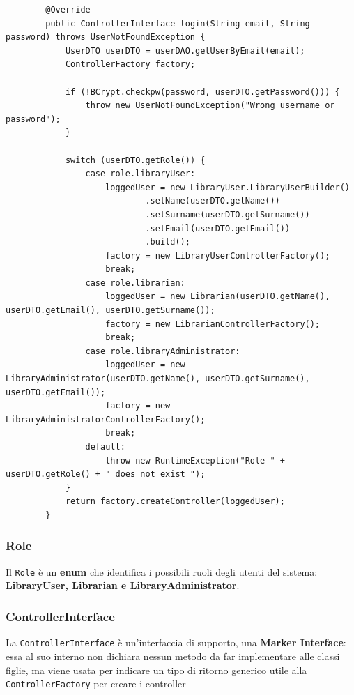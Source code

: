     \begin{listing}[H]
        \begin{verbatim}
        @Override
        public ControllerInterface login(String email, String password) throws UserNotFoundException {
            UserDTO userDTO = userDAO.getUserByEmail(email);
            ControllerFactory factory;
    
            if (!BCrypt.checkpw(password, userDTO.getPassword())) {
                throw new UserNotFoundException("Wrong username or password");
            }
    
            switch (userDTO.getRole()) {
                case role.libraryUser:
                    loggedUser = new LibraryUser.LibraryUserBuilder()
                            .setName(userDTO.getName())
                            .setSurname(userDTO.getSurname())
                            .setEmail(userDTO.getEmail())
                            .build();
                    factory = new LibraryUserControllerFactory();
                    break;
                case role.librarian:
                    loggedUser = new Librarian(userDTO.getName(), userDTO.getEmail(), userDTO.getSurname());
                    factory = new LibrarianControllerFactory();
                    break;
                case role.libraryAdministrator:
                    loggedUser = new LibraryAdministrator(userDTO.getName(), userDTO.getSurname(), userDTO.getEmail());
                    factory = new LibraryAdministratorControllerFactory();
                    break;
                default:
                    throw new RuntimeException("Role " + userDTO.getRole() + " does not exist ");
            }
            return factory.createController(loggedUser);
        }
        \end{verbatim}
        \caption{Metodo \textbf{login}}
        \label{lst:login}
    \end{listing}

    \subsubsection{Role}
    Il \texttt{Role} è un \textbf{enum} che identifica i possibili ruoli degli utenti del sistema: \textbf{LibraryUser, Librarian e LibraryAdministrator}.\\

    \subsubsection{ControllerInterface}
    La \texttt{ControllerInterface} è un'interfaccia di supporto, una \textbf{Marker Interface}: essa al suo interno non dichiara nessun metodo da far implementare alle classi figlie, ma viene usata per indicare un tipo di ritorno generico utile alla \texttt{ControllerFactory} per creare i controller\\

